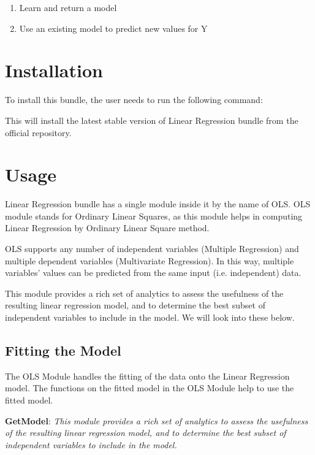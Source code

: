 \begin{enumerate}
    \item Learn and return a model
    \item Use an existing model to predict new values for Y
\end{enumerate}

\section{Installation}

To install this bundle, the user needs to run the following command:



This will install the latest stable version of Linear Regression bundle from the official repository.

\section{Usage}

Linear Regression bundle has a single module inside it by the name of OLS. OLS module stands for Ordinary Linear Squares, as this module helps in computing Linear Regression by Ordinary Linear Square method.

OLS supports any number of independent variables (Multiple Regression) and multiple dependent variables (Multivariate Regression). In this way, multiple variables’ values can be predicted from the same input (i.e. independent) data.

This module provides a rich set of analytics to assess the usefulness of the resulting linear regression model, and to determine the best subset of independent variables to include in the model. We will look into these below.

\subsection{Fitting the Model}

The OLS Module handles the fitting of the data onto the Linear Regression model. The functions on the fitted model in the OLS Module help to use the fitted model. 

\textbf{GetModel}: \textit{This module provides a rich set of analytics to assess the usefulness of the resulting linear regression model, and to determine the best subset of independent variables to include in the model.}


